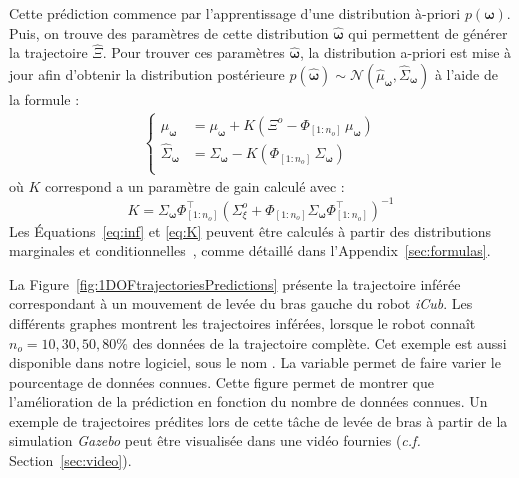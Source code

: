 \documentclass[utf8]{frontiersSCNS} %
\begin{document}
Cette prédiction commence par l'apprentissage d'une distribution à-priori $p(\boldsymbol{\omega})$. Puis, on trouve des paramètres de cette distribution $\hat{\boldsymbol{\omega}}$ qui permettent de générer la trajectoire $\hat{\Xi}$. Pour trouver ces paramètres $\hat{\boldsymbol{\omega}}$, la distribution a-priori est mise à jour afin d'obtenir la distribution postérieure $p(\hat{\boldsymbol{\omega}}) \sim \mathcal{N}(\hat{\mu}_{\boldsymbol{\omega}},\hat{\Sigma}_{\boldsymbol{\omega}})$ à l'aide de la formule :
\begin{eqnarray} \label{eq:inf}
\left\{
\begin{array}{rl}
\hat{\mu}_{\boldsymbol{\omega}} &= \mu_{\boldsymbol{\omega}} + K(\Xi^o - \Phi_{[1:n_o]} \, \mu_{\boldsymbol{\omega}}) \\ 
\hat{\Sigma}_{\boldsymbol{\omega}} &= \Sigma_{\boldsymbol{\omega}} - K(\Phi_{[1:n_o]} \, \Sigma_{\boldsymbol{\omega}}) \\
\end{array}
\right.
\end{eqnarray}
où $K$ correspond a un paramètre de gain calculé avec :
\begin{equation}\label{eq:K}
K= \Sigma_{\boldsymbol{\omega}}\Phi_{[1:n_o]}^\top(\Sigma_\xi^o + \Phi_{[1:n_o]}\Sigma_{\boldsymbol{\omega}} \Phi_{[1:n_o]}^\top)^{-1}
\end{equation}
Les Équations~\ref{eq:inf} et \ref{eq:K} peuvent être calculés à partir des distributions marginales et conditionnelles~\cite{paraschos2013probabilistic, Bishop:2006}, comme détaillé dans l'Appendix~\ref{sec:formulas}.


La Figure~\ref{fig:1DOFtrajectoriesPredictions} présente la trajectoire inférée correspondant à un mouvement de levée du bras gauche du robot \textit{iCub}. Les différents graphes montrent les trajectoires inférées, lorsque le robot connaît $n_{o}=10,30,50,80\%$ des données de la trajectoire complète. Cet exemple est aussi disponible dans notre logiciel, sous le nom . 
La variable  permet de faire varier le pourcentage de données connues. Cette figure permet de montrer que l'amélioration de la prédiction en fonction du nombre de données connues. Un exemple de trajectoires prédites lors de cette tâche de levée de bras à partir de la simulation \textit{Gazebo} peut être visualisée dans une vidéo fournies (\textit{c.f.} Section~\ref{sec:video}).
\end{document}
